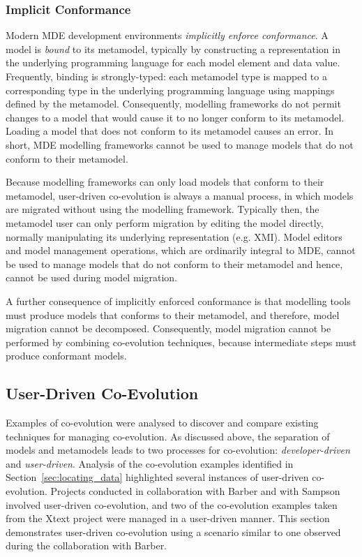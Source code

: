 \subsubsection{Implicit Conformance}
Modern MDE development environments \emph{implicitly enforce conformance}. A model is \emph{bound} to its metamodel, typically by constructing a representation in the underlying programming language for each model element and data value. Frequently, binding is strongly-typed: each metamodel type is mapped to a corresponding type in the underlying programming language using mappings defined by the metamodel. Consequently, modelling frameworks do not permit changes to a model that would cause it to no longer conform to its metamodel. Loading a model that does not conform to its metamodel causes an error. In short, MDE modelling frameworks cannot be used to manage models that do not conform to their metamodel.

Because modelling frameworks can only load models that conform to their metamodel, user-driven co-evolution is always a manual process, in which models are migrated without using the modelling framework. Typically then, the metamodel user can only perform migration by editing the model directly, normally manipulating its underlying representation (e.g. XMI). Model editors and model management operations, which are ordinarily integral to MDE, cannot be used to manage models that do not conform to their metamodel and hence, cannot be used during model migration.

A further consequence of implicitly enforced conformance is that modelling tools must produce models that conforms to their metamodel, and therefore, model migration cannot be decomposed. Consequently, model migration cannot be performed by combining co-evolution techniques, because intermediate steps must produce conformant models.


\subsection{User-Driven Co-Evolution}
\label{subsec:user-driven_co-evolution}
Examples of co-evolution were analysed to discover and compare existing techniques for managing co-evolution. As discussed above, the separation of models and metamodels leads to two processes for co-evolution: \emph{developer-driven} and \emph{user-driven}. Analysis of the co-evolution examples identified in Section~\ref{sec:locating_data} highlighted several instances of user-driven co-evolution. Projects conducted in collaboration with Barber and with Sampson involved user-driven co-evolution, and two of the co-evolution examples taken from the Xtext project were managed in a user-driven manner. This section demonstrates user-driven co-evolution using a scenario similar to one observed during the collaboration with Barber.

